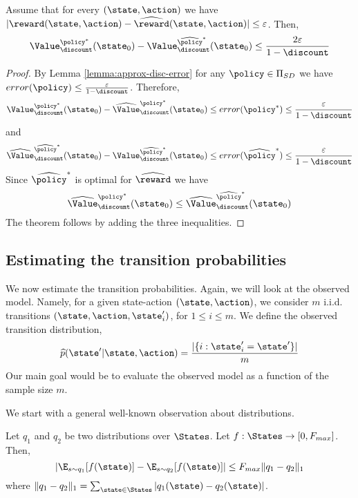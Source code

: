 \begin{theorem}
\label{thm:approx-model-disc}
%
Assume that for every $(\state,\action)$ we have
$|\reward(\state,\action)-\widehat{\reward}(\state,\action)|\leq
\varepsilon$. Then,
\[
\Value^{\policy^*}_\discount(\state_0) -
\Value^{\widehat{\policy}^*}_\discount(\state_0) \leq
\frac{2\varepsilon}{1-\discount}
\]
\end{theorem}

\begin{proof}
By Lemma \ref{lemma:approx-disc-error} for any $\policy\in {\Pi
_{SD}}$ we have $error(\policy)\leq
\frac{\varepsilon}{1-\discount}$. Therefore,
\[
\Value^{\policy^*}_\discount(\state_0)-
\widehat{\Value}^{\policy^*}_\discount(\state_0)\leq
error(\policy^*)\leq \frac{\varepsilon}{1-\discount}
\]
and
\[
\widehat{\Value}^{\widehat{\policy}^*}_\discount(\state_0)-
\Value^{\widehat{\policy}^*}_\discount(\state_0)\leq
error(\widehat{\policy}^*)\leq \frac{\varepsilon}{1-\discount}
\]
Since $\widehat{\policy}^*$ is optimal for $\widehat{\reward}$ we
have
\[
\widehat{\Value}^{\policy^*}_\discount(\state_0)\leq
\widehat{\Value}^{\widehat{\policy}^*}_\discount(\state_0)
\]
The theorem follows by adding the three inequalities.
\end{proof}

\subsection{Estimating the transition probabilities}

We now estimate the transition probabilities. Again, we will look at
the observed model. Namely, for a given state-action
$(\state,\action)$, we consider $m$ i.i.d.
 transitions
$(\state,\action,\state'_i)$, for $1\leq i\leq m$. We define the
observed transition distribution,
\[
\widehat{p}(\state'|\state,\action)=\frac{|\{i:\state'_i=\state'\}|}{m}
\]
Our main goal would be to evaluate the observed model as a function
of the sample size $m$.


We start with a general well-known observation about distributions.

\begin{theorem}
\label{thm:dist-l1} Let $q_1$ and $q_2$ be two distributions over
$\States$. Let $f:\States \rightarrow [0,F_{max}]$. Then,
\[
|\E_{s\sim q_1}[f(\state)]- \E_{s\sim q_2}[f(\state)]|\leq F_{max}
\|q_1-q_2\|_1
\]
where $\|q_1-q_2\|_1=\sum_{\state \in \States}
|q_1(\state)-q_2(\state)|$.
\end{theorem}

